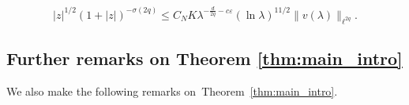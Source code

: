 \documentclass[12pt,reqno]{amsart}
\theoremstyle{definition}
\theoremstyle{remark}
\numberwithin{equation}{section}
\newcommand{\1}{\mathbbm{1}}
\renewcommand{\epsilon}{\varepsilon}
\begin{document}

$$
|z|^{1/2}(1+|z|)^{-\sigma(2q)}
\leq C_N K \lambda^{-\frac{d}{2q}-c\epsilon}(\ln\lambda)^{11/2}\|v(\lambda)\|_{\ell^{2q}}.
$$

\subsection{Further remarks on Theorem \ref{thm:main_intro}}

We also make the following remarks on~Theorem~\ref{thm:main_intro}.
\end{document}
